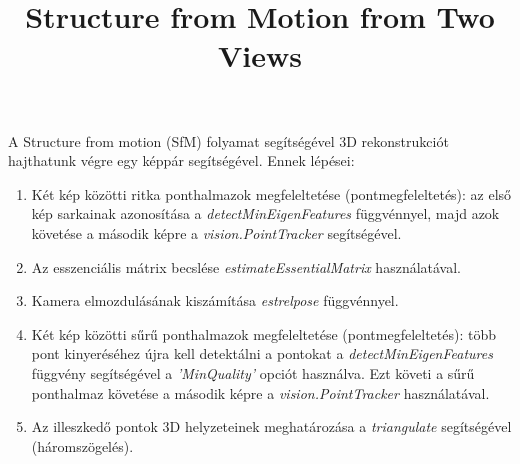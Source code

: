 \documentclass[10pt]{report}
\title{Structure from Motion from Two Views}
\date{}
\begin{document}
    \maketitle

    A Structure from motion (SfM) folyamat segítségével 3D rekonstrukciót hajthatunk végre egy képpár segítségével. Ennek lépései:

    \begin{enumerate}
        \item Két kép közötti ritka ponthalmazok megfeleltetése (pontmegfeleltetés): az első kép sarkainak azonosítása a \textit{detectMinEigenFeatures} függvénnyel, majd azok követése a második képre a \textit{vision.PointTracker} segítségével.
        \item Az esszenciális mátrix becslése \textit{estimateEssentialMatrix} használatával.
        \item Kamera elmozdulásának kiszámítása \textit{estrelpose} függvénnyel.
        \item Két kép közötti sűrű ponthalmazok megfeleltetése (pontmegfeleltetés): több pont kinyeréséhez újra kell detektálni a pontokat a \textit{detectMinEigenFeatures} függvény segítségével a \textit{'MinQuality'} opciót használva. Ezt követi a sűrű ponthalmaz követése a második képre a \textit{vision.PointTracker} használatával.
        \item Az illeszkedő pontok 3D helyzeteinek meghatározása a \textit{triangulate} segítségével (háromszögelés).
    \end{enumerate}    
\end{document}
